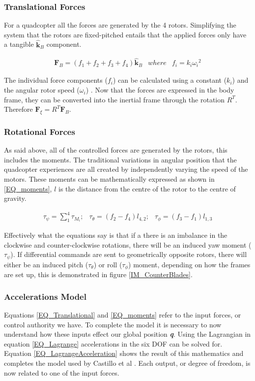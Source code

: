 	
		\subsubsection{Translational Forces}
		For a quadcopter all the forces are generated by the 4 rotors. Simplifying the system that the rotors are fixed-pitched entails that the applied forces only have a tangible $\hat{\textbf{k}}_B$ component.
		
		\begin{eqnarray}
		\textbf{F}_B = (f_1 + f_2 + f_3 + f_4)\hat{\textbf{k}}_B & where & f_i = k_i {\omega_i}^2
		\label{EQ_Translational}
		\end{eqnarray}
		
		The individual force components ($f_i$) can be calculated using a constant ($k_i$) and the angular rotor speed ($\omega_i$) \cite{RealTime}. Now that the forces are expressed in the body frame, they can be converted into the inertial frame through the rotation $R^T$. Therefore $\textbf{F}_\xi = R^T \textbf{F}_B$.
		
		\subsubsection{Rotational Forces}
		As said above, all of the controlled forces are generated by the rotors, this includes the moments. The traditional variations in angular position that the quadcopter experiences are all created by independently varying the speed of the motors. These moments can be mathematically expressed as shown in \ref{EQ_moments}, $l$ is the distance from the centre of the rotor to the centre of gravity. \cite{Modelling}
		
		\begin{eqnarray}
		\tau_\psi = \sum_{1}^{4} \tau_{M_i};&
		\tau_\theta = (f_2 - f_4)l_{4,2};&
		\tau_\phi = (f_3 - f_1)l_{1,3}
		\label{EQ_moments}
		\end{eqnarray}
		
		Effectively what the equations say is that if a there is an imbalance in the clockwise and counter-clockwise rotations, there will be an induced yaw moment ($\tau_\psi$). If differential commands are sent to geometrically opposite rotors, there will either be an induced pitch ($\tau_\theta$) or roll ($\tau_\phi$) moment, depending on how the frames are set up, this is demonstrated in figure \ref{IM_CounterBlades}.
	
		\subsubsection{Accelerations Model}
		Equations \ref{EQ_Translational} and \ref{EQ_moments} refer to the input forces, or control authority we have. To complete the model it is necessary to now understand how these inputs effect our global position \textbf{\textit{q}}. Using the Lagrangian in equation \ref{EQ_Lagrange} accelerations in the six DOF  can be solved for. Equation \ref{EQ_LagrangeAcceleration} shows the result of this mathematics and completes the model used by Castillo et al \cite{MiniFlying, RealTime}. Each output, or degree of freedom, is now related to one of the input forces.
		
